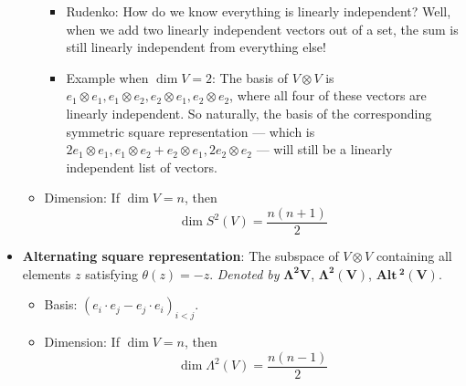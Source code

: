 \documentclass[../notes.tex]{subfiles}
\begin{document}
\begin{itemize}
\begin{itemize}
\begin{itemize}
            \item Rudenko: How do we know everything is linearly independent? Well, when we add two linearly independent vectors out of a set, the sum is still linearly independent from everything else!
            \item Example when $\dim V=2$: The basis of $V\otimes V$ is $e_1\otimes e_1,e_1\otimes e_2,e_2\otimes e_1,e_2\otimes e_2$, where all four of these vectors are linearly independent. So naturally, the basis of the corresponding symmetric square representation --- which is $2e_1\otimes e_1,e_1\otimes e_2+e_2\otimes e_1,2e_2\otimes e_2$ --- will still be a linearly independent list of vectors.
        \end{itemize}
        \item Dimension: If $\dim V=n$, then
        \begin{equation*}
            \dim S^2(V) = \frac{n(n+1)}{2}
        \end{equation*}
    \end{itemize}
    \item \textbf{Alternating square representation}: The subspace of $V\otimes V$ containing all elements $z$ satisfying $\theta(z)=-z$. \emph{Denoted by} $\bm{\Lambda^2V}$, $\bm{\Lambda^2(V)}$, $\pmb{\textbf{Alt}}\,\bm{{}^2(V)}$.
    \begin{itemize}
        \item Basis: $(e_i\cdot e_j-e_j\cdot e_i)_{i<j}$.
        \item Dimension: If $\dim V=n$, then
        \begin{equation*}
            \dim\Lambda^2(V) = \frac{n(n-1)}{2}
        \end{equation*}
    \end{itemize}
\end{itemize}
\end{document}
